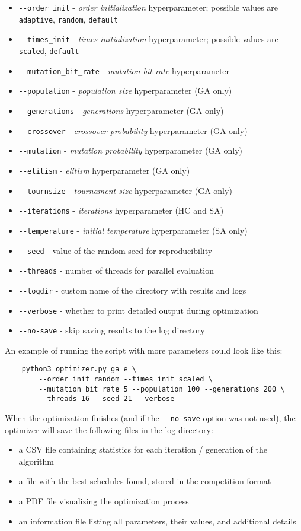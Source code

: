 \begin{itemize}
    \item \verb|--order_init| - \textit{order initialization} hyperparameter; possible values are \verb|adaptive|, \verb|random|, \verb|default|
    \item \verb|--times_init| - \textit{times initialization} hyperparameter; possible values are \verb|scaled|, \verb|default|
    \item \verb|--mutation_bit_rate| - \textit{mutation bit rate} hyperparameter
    \item \verb|--population| - \textit{population size} hyperparameter (GA only)
    \item \verb|--generations| - \textit{generations} hyperparameter (GA only)
    \item \verb|--crossover| - \textit{crossover probability} hyperparameter (GA only)
    \item \verb|--mutation| - \textit{mutation probability} hyperparameter (GA only)
    \item \verb|--elitism| - \textit{elitism} hyperparameter (GA only)
    \item \verb|--tournsize| - \textit{tournament size} hyperparameter (GA only)
    \item \verb|--iterations| - \textit{iterations} hyperparameter (HC and SA)
    \item \verb|--temperature| - \textit{initial temperature} hyperparameter (SA only)
    \item \verb|--seed| - value of the random seed for reproducibility
    \item \verb|--threads| - number of threads for parallel evaluation
    \item \verb|--logdir| - custom name of the directory with results and logs
    \item \verb|--verbose| - whether to print detailed output during optimization
    \item \verb|--no-save| - skip saving results to the log directory
\end{itemize}
An example of running the script with more parameters could look like this:
\begin{verbatim}
    python3 optimizer.py ga e \
        --order_init random --times_init scaled \
        --mutation_bit_rate 5 --population 100 --generations 200 \
        --threads 16 --seed 21 --verbose
\end{verbatim}
When the optimization finishes (and if the \verb|--no-save| option was not used), the optimizer will save the following files in the log directory:
\begin{itemize}
    \item a CSV file containing statistics for each iteration / generation of the algorithm
    \item a file with the best schedules found, stored in the competition format
    \item a PDF file visualizing the optimization process
    \item an information file listing all parameters, their values, and additional details
\end{itemize}

